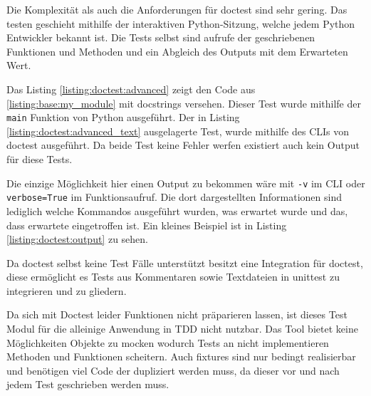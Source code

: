 Die Komplexität als auch die Anforderungen für doctest sind sehr gering. Das testen geschieht
mithilfe der interaktiven Python-Sitzung, welche jedem Python Entwickler bekannt ist. Die
Tests selbst sind aufrufe der geschriebenen Funktionen und Methoden und ein Abgleich des
Outputs mit dem Erwarteten Wert.

Das Listing \ref{listing:doctest:advanced} zeigt den Code aus \ref{listing:base:my_module} mit
\Glspl{docstring} versehen. Dieser Test wurde mithilfe der \lstinline{main} Funktion von Python
ausgeführt. Der in Listing \ref{listing:doctest:advanced_text} ausgelagerte Test, wurde mithilfe
des CLIs von doctest ausgeführt. Da beide Test keine Fehler werfen existiert auch kein Output
für diese Tests.

Die einzige Möglichkeit hier einen Output zu bekommen wäre mit \lstinline{-v} im CLI oder
\lstinline{verbose=True} im Funktionsaufruf. Die dort dargestellten Informationen sind
lediglich welche Kommandos ausgeführt wurden, was erwartet wurde und das, dass erwartete
eingetroffen ist. Ein kleines Beispiel ist in Listing \ref{listing:doctest:output} zu sehen.

Da doctest selbst keine Test Fälle unterstützt besitzt  eine
Integration für doctest, diese ermöglicht es Tests aus Kommentaren sowie Textdateien in
unittest zu integrieren und zu gliedern.

Da sich mit Doctest leider Funktionen nicht präparieren lassen, ist dieses Test Modul für die
alleinige Anwendung in TDD nicht nutzbar. Das Tool bietet keine Möglichkeiten Objekte zu \gls{mock}en
wodurch Tests an nicht implementieren Methoden und Funktionen scheitern. Auch \Glspl{fixture} sind
nur bedingt realisierbar und benötigen viel Code der dupliziert werden muss, da dieser vor und nach
jedem Test geschrieben werden muss.